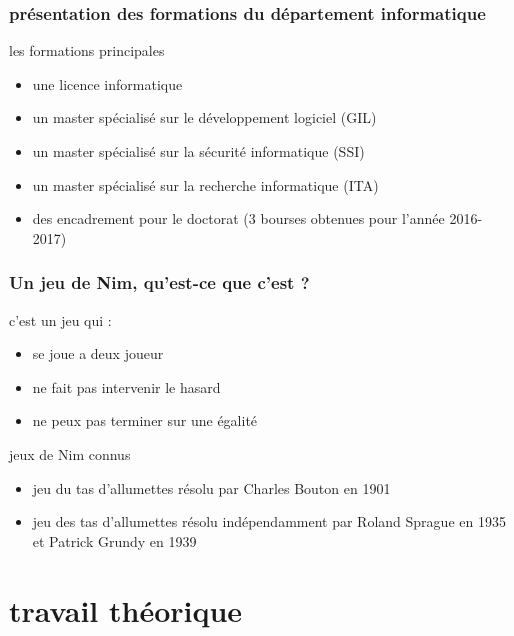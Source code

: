 \documentclass{beamer}
\begin{document}
  \begin{frame}
    \frametitle{présentation des formations du département informatique}

    \begin{block} {les formations principales}
      \begin{itemize}
        \item une licence informatique
        \item un master spécialisé sur le développement logiciel (GIL)
        \item un master spécialisé sur la sécurité informatique (SSI)
        \item un master spécialisé sur la recherche informatique (ITA)
        \item des encadrement pour le doctorat (3 bourses obtenues pour l’année 2016-2017)
      \end{itemize}
    \end{block}
  \end{frame}
  \begin{frame}
    \frametitle{Un jeu de Nim, qu'est-ce que c'est ?}

    \begin{block} {c'est un jeu qui :}
      \begin{itemize}
        \item se joue a deux joueur 
        \item ne fait pas intervenir le hasard
        \item ne peux pas terminer sur une égalité
      \end{itemize}
    \end{block}
    
    \pause

    \begin{block} {jeux de Nim connus}
      \begin{itemize}
        \item jeu du tas d’allumettes résolu par Charles Bouton en 1901
        \item jeu des tas d'allumettes résolu indépendamment par Roland Sprague en 1935 et Patrick Grundy en 1939
      \end{itemize}
    \end{block}
  \end{frame}

  \section{travail théorique}
  \label{sec: travail théorique}
\end{document}

